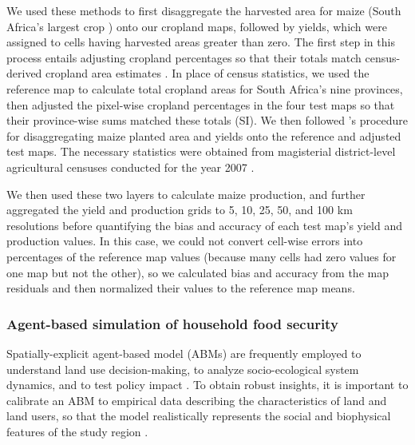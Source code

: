 \documentclass[a4paper]{article}
\newcommand{\citetapos}[1]{\citeauthor{#1}'s \citeyearpar{#1}}
\begin{document}
We used these methods to first disaggregate the harvested area for maize (South Africa's largest crop \citep{estes_projected_2013}) onto our cropland maps, followed by yields, which were assigned to cells having harvested areas greater than zero. The first step in this process entails adjusting cropland percentages so that their totals match census-derived cropland area estimates \citep{ramankutty_farming_2008,schierhorn_post-soviet_2013}. In place of census statistics, we used the reference map to calculate total cropland areas for South Africa's nine provinces, then adjusted the pixel-wise cropland percentages in the four test maps so that their province-wise sums matched these totals (SI). We then followed \citetapos{monfreda_farming_2008} procedure for disaggregating maize \citep[South Africa's largest crop;][]{estes_comparing_2013} planted area and yields onto the reference and adjusted test maps. The necessary statistics were obtained from magisterial district-level agricultural censuses conducted for the year 2007 \citep{statistics_south_africa_building_2007}. 

We then used these two layers to calculate maize production, and further aggregated the yield and production grids to 5, 10, 25, 50, and 100 km resolutions before quantifying the bias and accuracy of each test map's yield and production values. In this case, we could not convert cell-wise errors into percentages of the reference map values (because many cells had zero values for one map but not the other), so we calculated bias and accuracy from the map residuals and then normalized their values to the reference map means. 


\vspace{-0.3 cm}
\subsubsection*{Agent-based simulation of household food security }
\vspace{-0.2 cm}
Spatially-explicit agent-based model (ABMs) are frequently employed to understand land use decision-making, to analyze socio-ecological system dynamics, and to test policy impact \citep{berger_creating_2006}. To obtain robust insights, it is important to calibrate an ABM to empirical data describing the characteristics of land and land users, so that the model realistically represents the social and biophysical features of the study region \citep{berger_creating_2006}. 
\end{document}
